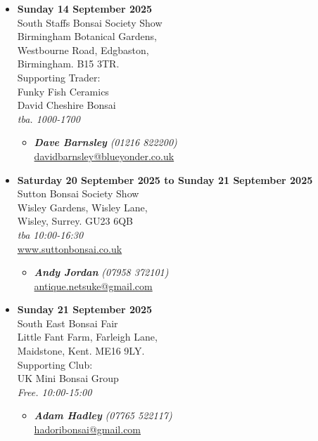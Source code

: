 \begin{itemize}
    \item \textbf{Sunday 14 September 2025}
    \\
    South Staffs Bonsai Society Show \\
    Birmingham Botanical Gardens, \\
    Westbourne Road, Edgbaston, \\
    Birmingham. B15 3TR. \\
    Supporting Trader: \\
    Funky Fish Ceramics \\
    David Cheshire Bonsai
    \\
    \emph{tba. 1000-1700}
    \begin{itemize}
        \item \textbf{\emph{Dave Barnsley}} \emph{(01216 822200)} \\
        \href{mailto:davidbarnsley@blueyonder.co.uk}{davidbarnsley@blueyonder.co.uk} 
    \end{itemize}

    \item \textbf{Saturday 20 September 2025 to Sunday 21 September 2025}
    \\
    Sutton Bonsai Society Show \\
    Wisley Gardens, Wisley Lane, \\
    Wisley, Surrey. GU23 6QB
    \\
    \emph{tba 10:00-16:30}
    \\
    \href{https://www.suttonbonsai.co.uk}{www.suttonbonsai.co.uk}
    \begin{itemize}
        \item \textbf{\emph{Andy Jordan}} \emph{(07958 372101)} \\
        \href{mailto:antique.netsuke@gmail.com}{antique.netsuke@gmail.com} 
    \end{itemize}

    \item \textbf{Sunday 21 September 2025}
    \\
    South East Bonsai Fair \\
    Little Fant Farm, Farleigh Lane, \\
    Maidstone, Kent. ME16 9LY. \\
    Supporting Club: \\
    UK Mini Bonsai Group
    \\
    \emph{Free. 10:00-15:00}
    \begin{itemize}
        \item \textbf{\emph{Adam Hadley}} \emph{(07765 522117)} \\
        \href{mailto:hadoribonsai@gmail.com}{hadoribonsai@gmail.com} 
    \end{itemize}


\end{itemize}
